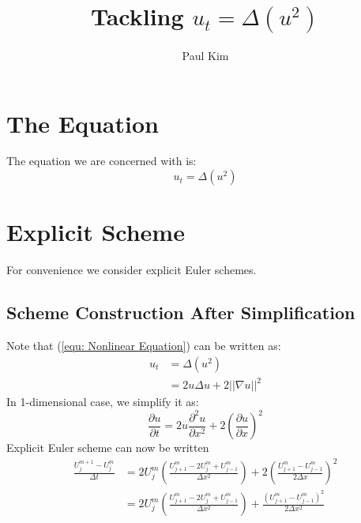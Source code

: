 \documentclass[a4paper]{article}
\title{Tackling $u_{t} = \Delta \left( u^2 \right)$}
\author{Paul Kim}
\begin{document}
\maketitle
\section{The Equation}
The equation we are concerned with is:
\begin{equation}
    u_{t} = \Delta \left( u^2 \right)
    \label{equ: Nonlinear Equation}
\end{equation}

\section{Explicit Scheme}
For convenience we consider explicit Euler schemes.

\subsection{Scheme Construction After Simplification}
Note that (\ref{equ: Nonlinear Equation}) can be written as:
\begin{align}
    u_t &= \Delta \left( u^2 \right) \\
    &= 2 u \Delta u + 2 || \nabla u ||^2
\end{align}
In 1-dimensional case, we simplify it as:
\begin{equation}
    \frac{\partial u}{\partial t} = 2 u \frac{\partial^2 u}{\partial x^2} + 2 \left( \frac{\partial u}{\partial x} \right)^2
\end{equation}
Explicit Euler scheme can now be written
\begin{align}
    \frac{U_j^{m+1} - U_j^m}{\Delta t}
    &= 2 U_j^m \left( \frac{U_{j+1}^m - 2 U_{j}^m + U_{j-1}^m}{\Delta x^2} \right)
    + 2 \left( \frac{U_{j+1}^m - U_{j-1}^m}{2 \Delta x} \right)^2 \\
    &= 2 U_j^m \left( \frac{U_{j+1}^m - 2 U_{j}^m + U_{j-1}^m}{\Delta x^2} \right)
    + \frac{\left( U_{j+1}^m - U_{j-1}^m \right)^2}{2 \Delta x^2}
\end{align}
\end{document}
